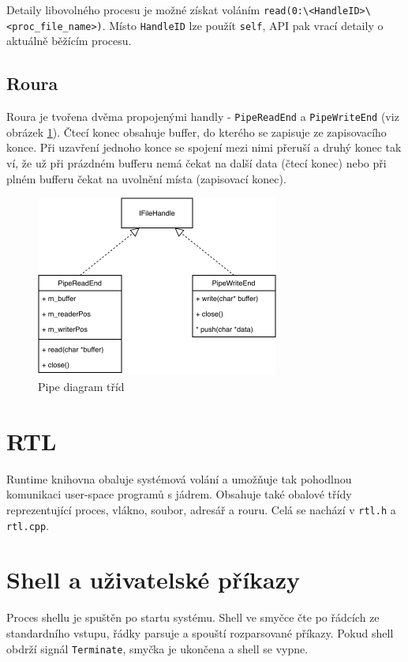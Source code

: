 \documentclass[11pt,a4paper]{scrartcl}
\begin{document}
	Detaily libovolného procesu je možné získat voláním \verb|read(0:\<HandleID>\<proc_file_name>)|. Místo \verb|HandleID| lze použít \verb|self|, API pak vrací detaily o aktuálně běžícím procesu.

	
	\subsection{Roura}
	
	Roura je tvořena dvěma propojenými handly - \verb|PipeReadEnd| a \verb|PipeWriteEnd| (viz obrázek \ref{fig:pipe-c}). Čtecí konec obsahuje buffer, do kterého se zapisuje ze zapisovacího konce. Při uzavření jednoho konce se spojení mezi nimi přeruší a druhý konec tak ví, že už při prázdném bufferu nemá čekat na další data (čtecí konec) nebo při plném bufferu čekat na uvolnění místa (zapisovací konec).
	
	\begin{figure}[H]
		\centering
		\includegraphics[width=8cm]{pipe-c.pdf}
		\caption{Pipe diagram tříd}
		\label{fig:pipe-c}
	\end{figure}
	
	\section{RTL}
	Runtime knihovna obaluje systémová volání a umožňuje tak pohodlnou komunikaci user-space programů s jádrem. Obsahuje také obalové třídy reprezentující proces, vlákno, soubor, adresář a rouru. Celá se nachází v \verb|rtl.h| a \verb|rtl.cpp|.
	
	\section{Shell a uživatelské příkazy}
	Proces shellu je spuštěn po startu systému. Shell ve smyčce čte po řádcích ze standardního vstupu, řádky parsuje a spouští rozparsované příkazy. Pokud shell obdrží signál \verb|Terminate|, smyčka je ukončena a shell se vypne.
	
\end{document}
